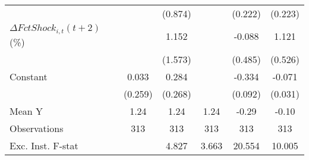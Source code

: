 {\begin{tabular}{l*{5}{c}}
                    &                     &     (0.874)         &                     &     (0.222)         &     (0.223)         \\
\addlinespace
$ \Delta FctShock_{i,t}(t+2)$ (\%)&                     &       1.152         &                     &      -0.088         &       1.121\sym{**} \\
                    &                     &     (1.573)         &                     &     (0.485)         &     (0.526)         \\
\addlinespace
Constant            &       0.033         &       0.284         &                     &      -0.334\sym{***}&      -0.071\sym{**} \\
                    &     (0.259)         &     (0.268)         &                     &     (0.092)         &     (0.031)         \\
\midrule
Mean Y              &        1.24         &        1.24         &        1.24         &       -0.29         &       -0.10         \\
Observations        &         313         &         313         &         313         &         313         &         313         \\
Exc. Inst. F-stat   &                     &       4.827         &       3.663         &      20.554         &      10.005         \\
\bottomrule
\end{tabular}
}
